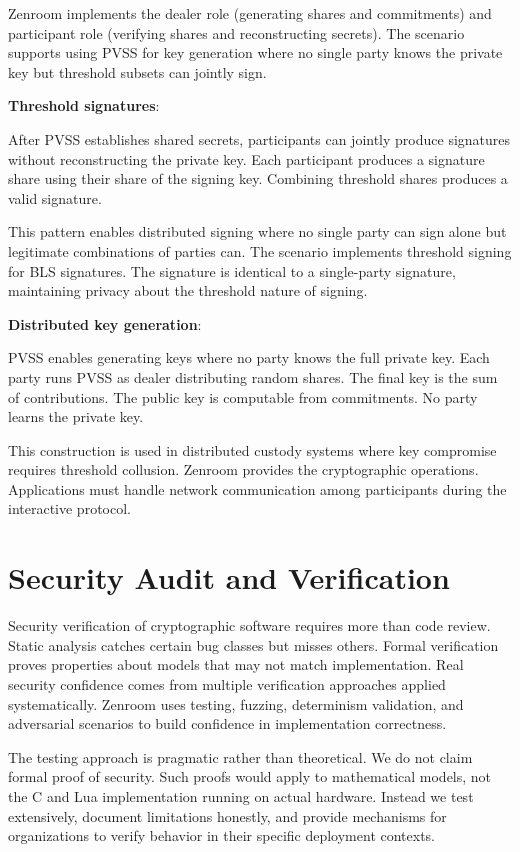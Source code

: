 Zenroom implements the dealer role (generating shares and commitments)
and participant role (verifying shares and reconstructing
secrets). The scenario supports using PVSS for key generation where no
single party knows the private key but threshold subsets can jointly
sign.

\textbf{Threshold signatures}:

After PVSS establishes shared secrets, participants can jointly
produce signatures without reconstructing the private key. Each
participant produces a signature share using their share of the
signing key. Combining threshold shares produces a valid signature.

This pattern enables distributed signing where no single party can
sign alone but legitimate combinations of parties can. The scenario
implements threshold signing for BLS signatures. The signature is
identical to a single-party signature, maintaining privacy about the
threshold nature of signing.

\textbf{Distributed key generation}:

PVSS enables generating keys where no party knows the full private
key. Each party runs PVSS as dealer distributing random shares. The
final key is the sum of contributions. The public key is computable
from commitments. No party learns the private key.

This construction is used in distributed custody systems where key
compromise requires threshold collusion. Zenroom provides the
cryptographic operations. Applications must handle network
communication among participants during the interactive protocol.

\section{Security Audit and Verification}

Security verification of cryptographic software requires more than
code review. Static analysis catches certain bug classes but misses
others. Formal verification proves properties about models that may
not match implementation. Real security confidence comes from multiple
verification approaches applied systematically. Zenroom uses testing,
fuzzing, determinism validation, and adversarial scenarios to build
confidence in implementation correctness.

The testing approach is pragmatic rather than theoretical. We do not
claim formal proof of security. Such proofs would apply to
mathematical models, not the C and Lua implementation running on
actual hardware. Instead we test extensively, document limitations
honestly, and provide mechanisms for organizations to verify behavior
in their specific deployment contexts.

